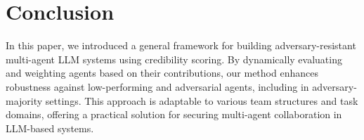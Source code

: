 \section{Conclusion}\label{sec:conclusion}
In this paper, we introduced a general framework for building adversary-resistant multi-agent LLM systems using credibility scoring. By dynamically evaluating and weighting agents based on their contributions, our method enhances robustness against low-performing and adversarial agents, including in adversary-majority settings. This approach is adaptable to various team structures and task domains, offering a practical solution for securing multi-agent collaboration in LLM-based systems.